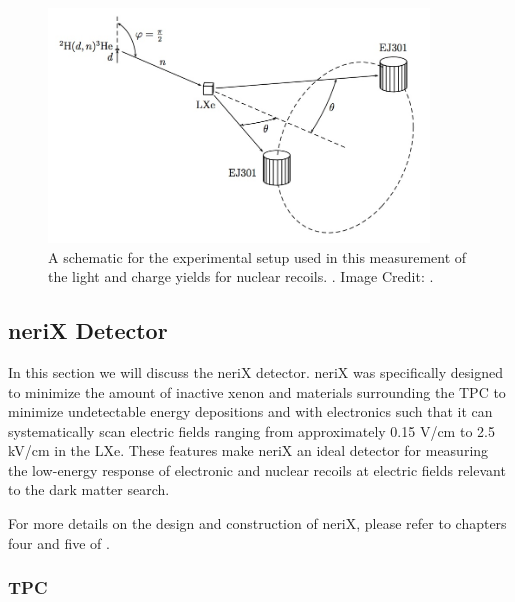 \begin{figure}[t]
        \centering
	\includegraphics[width=0.9\textwidth]{nerix_expt_schematic}
	\caption{A schematic for the experimental setup used in this measurement of the light and charge yields for nuclear recoils.  .  Image Credit: .}
	\label{fig:nerix_expt_schematic}
\end{figure}


\subsection{neriX Detector}

In this section we will discuss the neriX detector.  neriX was specifically designed to minimize the amount of inactive xenon and materials surrounding the TPC to minimize undetectable energy depositions and with electronics such that it can systematically scan electric fields ranging from approximately 0.15 V/cm to 2.5 kV/cm in the LXe.  These features make neriX an ideal detector for measuring the low-energy response of electronic and nuclear recoils at electric fields relevant to the dark matter search.

For more details on the design and construction of neriX, please refer to chapters four and five of .

\subsubsection{TPC}

